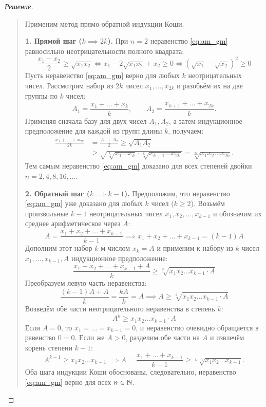 \begin{proof}[Решение]~\\
    \begin{quote}
        Применим метод прямо-обратной индукции Коши.

        \textbf{1. Прямой шаг ($k \implies 2k$).} 
        При $n = 2$ неравенство \eqref{eq:am_gm} равносильно 
        неотрицательности полного квадрата:
        \[
            \frac{x_1 + x_2}{2} \ge \sqrt{x_1 x_2} \iff 
            x_1 - 2\sqrt{x_1 x_2} + x_2 \ge 0 \iff 
            \left(\sqrt{x_1} - \sqrt{x_2}\right)^2 \ge 0
        \]
        Пусть неравенство \eqref{eq:am_gm} верно для любых $k$ 
        неотрицательных чисел. Рассмотрим набор из $2k$ чисел 
        $x_1, \dots, x_{2k}$ и разобьём их на две группы по $k$ чисел:
        \[
            A_1 = \frac{x_1 + \dots + x_k}{k}, \qquad
            A_2 = \frac{x_{k+1} + \dots + x_{2k}}{k}.
        \]
        Применяя сначала базу для двух чисел $A_1, A_2$, а затем 
        индукционное предположение для каждой из групп длины $k$, получаем:
        \begin{align*}
            \frac{x_1 + \dots + x_{2k}}{2k} &= \frac{A_1 + A_2}{2} \ge 
            \sqrt{A_1 A_2} \\
            &\ge \sqrt{\sqrt[k]{x_1 \dots x_k} \cdot 
            \sqrt[k]{x_{k+1} \dots x_{2k}}} = 
            \sqrt[2k]{x_1 x_2 \dots x_{2k}}.
        \end{align*}
        Тем самым неравенство \eqref{eq:am_gm} доказано для всех степеней 
        двойки $n = 2, 4, 8, 16, \dots$.

        \textbf{2. Обратный шаг ($k \implies k - 1$).} 
        Предположим, что неравенство \eqref{eq:am_gm} уже доказано для 
        любых $k$ чисел ($k \ge 2$). Возьмём произвольные $k - 1$ 
        неотрицательных чисел $x_1, x_2, \dots, x_{k-1}$ и обозначим их 
        среднее арифметическое через $A$:
        \[
            A = \frac{x_1 + x_2 + \dots + x_{k-1}}{k - 1} \implies 
            x_1 + x_2 + \dots + x_{k-1} = (k - 1)A
        \]
        Дополним этот набор $k$-м числом $x_k = A$ и применим к набору из 
        $k$ чисел $x_1, \dots, x_{k-1}, A$ индукционное предположение:
        \[
            \frac{x_1 + x_2 + \dots + x_{k-1} + A}{k} \ge 
            \sqrt[k]{x_1 x_2 \dots x_{k-1} \cdot A}
        \]
        Преобразуем левую часть неравенства:
        \[
            \frac{(k - 1)A + A}{k} = \frac{k A}{k} = A \implies 
            A \ge \sqrt[k]{x_1 x_2 \dots x_{k-1} \cdot A}
        \]
        Возведём обе части неотрицательного неравенства в степень $k$:
        \[
            A^k \ge x_1 x_2 \dots x_{k-1} \cdot A
        \]
        Если $A = 0$, то $x_1 = \dots = x_{k-1} = 0$, и неравенство 
        очевидно обращается в равенство $0 = 0$. Если же $A > 0$, разделим 
        обе части на $A$ и извлечём корень степени $k - 1$:
        \[
            A^{k-1} \ge x_1 x_2 \dots x_{k-1} \implies 
            A = \frac{x_1 + \dots + x_{k-1}}{k - 1} \ge 
            \sqrt[k-1]{x_1 x_2 \dots x_{k-1}}.
        \]
        Оба шага индукции Коши обоснованы, следовательно, неравенство 
        \eqref{eq:am_gm} верно для всех $n \in \mathbb{N}$.
    \end{quote}
\end{proof}

